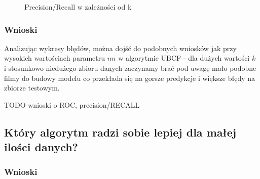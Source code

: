 \documentclass[12pt, a4paper]{article}
\begin{document}
\begin{figure}[H]
  \begin{center}
  \end{center}
  \caption{Precision/Recall w zależności od k}
  \label{fig:ubcf-nn-rmse}
\end{figure}



\subsubsection{Wnioski}
Analizując wykresy błędów, można dojść do podobnych wniosków jak przy wysokich wartościach parametru $nn$ w algorytmie UBCF - dla dużych wartości $k$ i stosunkowo niedużego zbioru danych zaczynamy brać pod uwagę mało podobne filmy do budowy modelu co przekłada się na gorsze predykcje i większe błędy na zbiorze testowym.

TODO wnioski o ROC, precision/RECALL

\subsection{Który algorytm radzi sobie lepiej dla małej ilości danych?}

\subsubsection{Wnioski}
\end{document}
